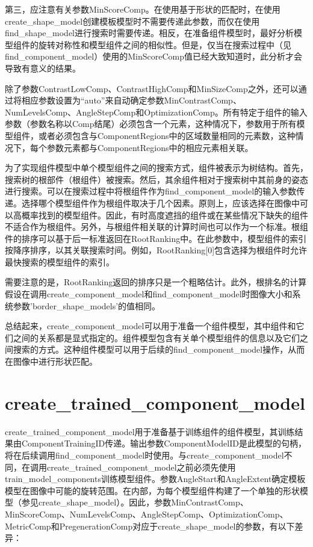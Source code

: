 \documentclass{article}
\begin{document}
第三，应注意有关参数MinScoreComp。在使用基于形状的匹配时，在使用create\_shape\_model创建模板模型时不需要传递此参数，而仅在使用find\_shape\_model进行搜索时需要传递。相反，在准备组件模型时，最好分析模型组件的旋转对称性和模型组件之间的相似性。但是，仅当在搜索过程中（见find\_component\_model）使用的MinScoreComp值已经大致知道时，此分析才会导致有意义的结果。

除了参数ContrastLowComp、ContrastHighComp和MinSizeComp之外，还可以通过将相应参数设置为“auto”来自动确定参数MinContrastComp、NumLevelsComp、AngleStepComp和OptimizationComp。所有特定于组件的输入参数（参数名称以Comp结尾）必须包含一个元素，这种情况下，参数用于所有模型组件，或者必须包含与ComponentRegions中的区域数量相同的元素数，这种情况下，每个参数元素都与ComponentRegions中的相应元素相关联。

为了实现组件模型中单个模型组件之间的搜索方式，组件被表示为树结构。首先，搜索树的根部件（根组件）被搜索。然后，其余组件相对于搜索树中其前身的姿态进行搜索。可以在搜索过程中将根组件作为find\_component\_model的输入参数传递。选择哪个模型组件作为根组件取决于几个因素。原则上，应该选择在图像中可以高概率找到的模型组件。因此，有时高度遮挡的组件或在某些情况下缺失的组件不适合作为根组件。另外，与根组件相关联的计算时间也可以作为一个标准。根组件的排序可以基于后一标准返回在RootRanking中。在此参数中，模型组件的索引按降序排序，以其关联搜索时间。例如，RootRanking[0]包含选择为根组件时允许最快搜索的模型组件的索引。

需要注意的是，RootRanking返回的排序只是一个粗略估计。此外，根排名的计算假设在调用create\_component\_model和find\_component\_model时图像大小和系统参数'border\_shape\_models'的值相同。

总结起来，create\_component\_model可以用于准备一个组件模型，其中组件和它们之间的关系都是显式指定的。组件模型包含有关单个模型组件的信息以及它们之间搜索的方式。这种组件模型可以用于后续的find\_component\_model操作，从而在图像中进行形状匹配。

\section{create\_trained\_component\_model}
create\_trained\_component\_model用于准备基于训练组件的组件模型，其训练结果由ComponentTrainingID传递。输出参数ComponentModelID是此模型的句柄，将在后续调用find\_component\_model时使用。与create\_component\_model不同，在调用create\_trained\_component\_model之前必须先使用train\_model\_components训练模型组件。参数AngleStart和AngleExtent确定模板模型在图像中可能的旋转范围。在内部，为每个模型组件构建了一个单独的形状模型（参见create\_shape\_model）。因此，参数MinContrastComp、MinScoreComp、NumLevelsComp、AngleStepComp、OptimizationComp、MetricComp和PregenerationComp对应于create\_shape\_model的参数，有以下差异：
\end{document}
